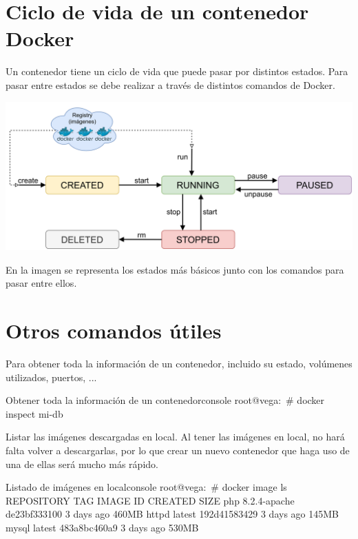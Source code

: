 \section{Ciclo de vida de un contenedor Docker}
Un contenedor tiene un ciclo de vida que puede pasar por distintos estados. Para pasar entre estados se debe realizar a través de distintos comandos de Docker.

\begin{center}
    \includegraphics[width=0.9\linewidth]{img/docker/lifecycle.png}
\end{center}

En la imagen se representa los estados más básicos junto con los comandos para pasar entre ellos.


\section{Otros comandos útiles}

Para obtener toda la información de un contenedor, incluido su estado, volúmenes utilizados, puertos, ...

\begin{mycode}{Obtener toda la información de un contenedor}{console}{}
root@vega:~# docker inspect mi-db
\end{mycode}

Listar las imágenes descargadas en local. Al tener las imágenes en local, no hará falta volver a descargarlas, por lo que crear un nuevo contenedor que haga uso de una de ellas será mucho más rápido.

\begin{mycode}{Listado de imágenes en local}{console}{}
root@vega:~# docker image ls
REPOSITORY       TAG            IMAGE ID       CREATED        SIZE
php              8.2.4-apache   de23bf333100   3 days ago     460MB
httpd            latest         192d41583429   3 days ago     145MB
mysql            latest         483a8bc460a9   3 days ago     530MB
\end{mycode}

